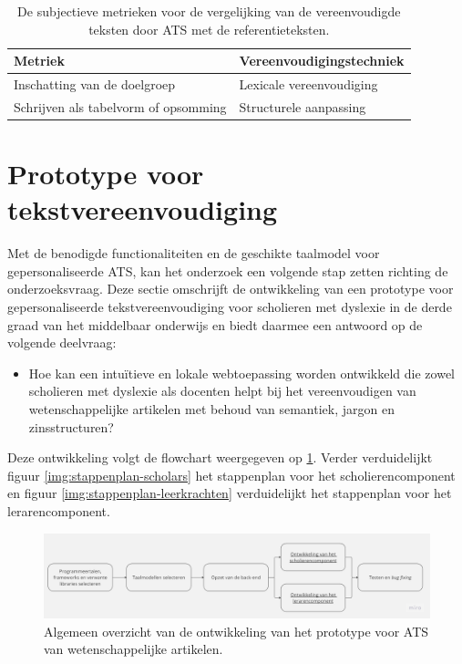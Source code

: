 \begin{center}
	\begin{table}[H]
		\begin{tabular}{ | m{7cm} | m{7cm} | } 
			\hline
			\textbf{Metriek} & \textbf{Vereenvoudigingstechniek} \\
			\hline
			Inschatting van de doelgroep & Lexicale vereenvoudiging \\
			\hline
			Schrijven als tabelvorm of opsomming & Structurele aanpassing \\
			\hline
		\end{tabular}
	\caption{De subjectieve metrieken voor de vergelijking van de vereenvoudigde teksten door ATS met de referentieteksten.}
	\label{table:verg-studie-reftekst-metrieken}
	\end{table}
\end{center}

\section{Prototype voor tekstvereenvoudiging}

Met de benodigde functionaliteiten en de geschikte taalmodel voor gepersonaliseerde ATS, kan het onderzoek een volgende stap zetten richting de onderzoeksvraag. Deze sectie omschrijft de ontwikkeling van een prototype voor gepersonaliseerde tekstvereenvoudiging voor scholieren met dyslexie in de derde graad van het middelbaar onderwijs en biedt daarmee een antwoord op de volgende deelvraag: 

\begin{itemize}
	\item Hoe kan een intuïtieve en lokale webtoepassing worden ontwikkeld die zowel scholieren met dyslexie als docenten helpt bij het vereenvoudigen van wetenschappelijke artikelen met behoud van semantiek, jargon en zinsstructuren?
\end{itemize}

Deze ontwikkeling volgt de flowchart weergegeven op \ref{img:general-overview-prototype}. Verder verduidelijkt figuur \ref{img:stappenplan-scholars} het stappenplan voor het scholierencomponent en figuur \ref{img:stappenplan-leerkrachten} verduidelijkt het stappenplan voor het lerarencomponent.

\begin{figure}
	\includegraphics[width=\linewidth]{img/flowchart-general-development.jpg}
	\caption{Algemeen overzicht van de ontwikkeling van het prototype voor ATS van wetenschappelijke artikelen.}
	\label{img:general-overview-prototype}
\end{figure}



